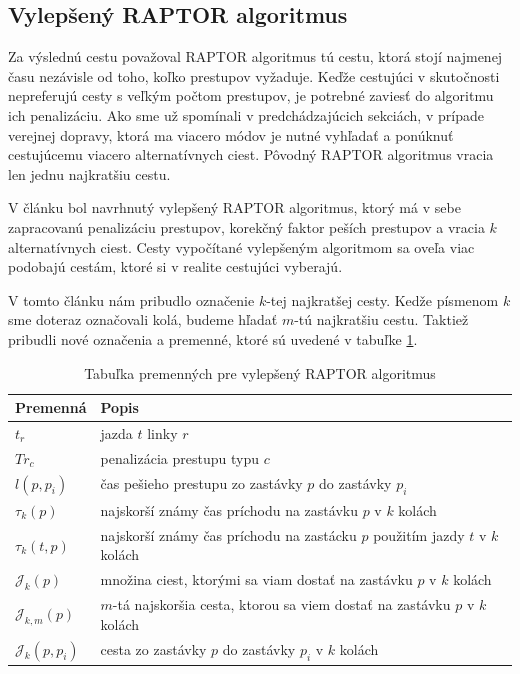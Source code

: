 \subsection{Vylepšený RAPTOR algoritmus}
Za výslednú cestu považoval RAPTOR algoritmus tú cestu, ktorá stojí najmenej času nezávisle od toho, koľko prestupov vyžaduje. Keďže cestujúci v skutočnosti nepreferujú cesty s veľkým počtom prestupov, je potrebné zaviesť do algoritmu ich penalizáciu. Ako sme už spomínali v predchádzajúcich sekciách, v prípade verejnej dopravy, ktorá ma viacero módov je nutné vyhľadať a ponúknuť cestujúcemu viacero alternatívnych ciest. Pôvodný RAPTOR algoritmus vracia len jednu najkratšiu cestu. 

V článku \cite{improvedRaptor} bol navrhnutý vylepšený RAPTOR algoritmus, ktorý má v sebe zapracovanú penalizáciu prestupov, korekčný faktor peších prestupov a vracia $k$ alternatívnych ciest. Cesty vypočítané vylepšeným algoritmom sa oveľa viac podobajú cestám, ktoré si v realite cestujúci vyberajú.

V tomto článku nám pribudlo označenie $k$-tej najkratšej cesty. Kedže písmenom $k$ sme doteraz označovali kolá, budeme hľadať $m$-tú najkratšiu cestu. Taktiež pribudli nové označenia a premenné, ktoré sú uvedené v tabuľke \ref{table:raptor-variables}.

\begin{table}[H]
\begin{tabular}{|l|l|}
\hline
\rowcolor[HTML]{C0C0C0} 
\textbf{Premenná} & \textbf{Popis} \\ \hline
$t_r$             & jazda $t$ linky $r$          \\ \hline
$Tr_c$             & penalizácia prestupu typu $c$          \\ \hline
$l(p, p_i)$       & čas pešieho prestupu zo zastávky $p$ do zastávky $p_i$ \\ \hline
$\tau_k(p)$			& najskorší známy čas príchodu na zastávku $p$ v $k$ kolách \\ \hline
$\tau_k(t, p)$    & najskorší známy čas príchodu na zastácku $p$ použitím jazdy $t$ v $k$ kolách \\ \hline
$\mathcal{J}_k(p)$ & množina ciest, ktorými sa viam dostať na zastávku $p$ v $k$ kolách \\ \hline
$\mathcal{J}_{k,m}(p)$ & $m$-tá najskoršia cesta, ktorou sa viem dostať na zastávku $p$ v $k$ kolách \\ \hline
$\mathcal{J}_k(p, p_i)$ & cesta zo zastávky $p$ do zastávky $p_i$ v $k$ kolách \\ \hline
\end{tabular}
\caption{Tabuľka premenných pre vylepšený RAPTOR algoritmus}
\label{table:raptor-variables}
\end{table}

